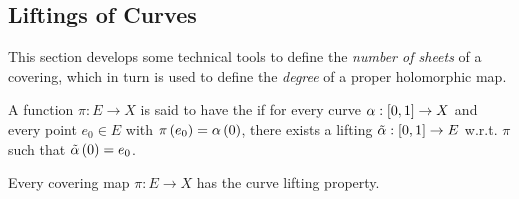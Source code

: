 \documentclass[../Moduli_Spaces_of_Riemann_Surfaces.tex]{subfiles}
\begin{document}
    \subsection{Liftings of Curves}
    This section develops some technical tools to define the \textit{number of sheets} of a covering, which in turn is used to define the \textit{degree} of a proper holomorphic map.
    \begin{definition}
        A function $\pi:E\to X$ is said to have the  if for every curve $\alpha:\left[0,1\right]\to X$ and every point $e_0\in E$ with $\pi\left(e_0\right)=\alpha\left(0\right)$, there exists a lifting $\tilde{\alpha}:\left[0,1\right]\to E$ w.r.t. $\pi$ such that $\tilde{\alpha}\left(0\right)=e_0$.
    \end{definition}
    \begin{proposition}
        Every covering map $\pi:E\to X$ has the curve lifting property.
    \end{proposition}
\end{document}
